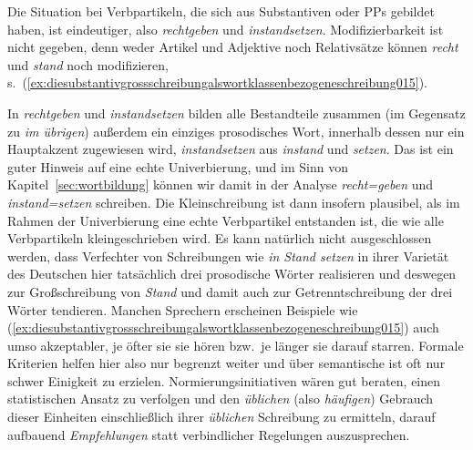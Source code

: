Die Situation bei Verbpartikeln, die sich aus Substantiven oder PPs gebildet haben, ist eindeutiger, also \zB \textit{rechtgeben} und \textit{instandsetzen}.
Modifizierbarkeit ist nicht gegeben, denn weder Artikel und Adjektive noch Relativsätze können \textit{recht} und \textit{stand} noch modifizieren, s.\ (\ref{ex:diesubstantivgrossschreibungalswortklassenbezogeneschreibung015}).


\begin{exe}
  \ex\label{ex:diesubstantivgrossschreibungalswortklassenbezogeneschreibung015}
  \begin{xlist}
  \end{xlist}
\end{exe}

In \textit{rechtgeben} und \textit{instandsetzen} bilden alle Bestandteile zusammen (im Gegensatz zu \textit{im übrigen}) außerdem ein einziges prosodisches Wort, innerhalb dessen nur ein Hauptakzent zugewiesen wird, \zB \textit{in\Akz standsetzen} aus \textit{in\Akz stand} und \textit{\Akz setzen}.
Das ist ein guter Hinweis auf eine echte Univerbierung, und im Sinn von Kapitel~\ref{sec:wortbildung} können wir damit in der Analyse \textit{recht=geben} und \textit{instand=setzen} schreiben.
Die Kleinschreibung ist dann insofern plausibel, als im Rahmen der Univerbierung eine echte Verbpartikel entstanden ist, die wie alle Verbpartikeln kleingeschrieben wird.
Es kann natürlich nicht ausgeschlossen werden, dass Verfechter von Schreibungen wie \textit{in Stand setzen} in ihrer Varietät des Deutschen hier tatsächlich drei prosodische Wörter realisieren und deswegen zur Großschreibung von \textit{Stand} und damit auch zur Getrenntschreibung der drei Wörter tendieren.
Manchen Sprechern erscheinen Beispiele wie (\ref{ex:diesubstantivgrossschreibungalswortklassenbezogeneschreibung015}) auch umso akzeptabler, je öfter sie sie hören bzw.\ je länger sie darauf starren.
Formale Kriterien helfen hier also nur begrenzt weiter und über semantische ist oft nur schwer Einigkeit zu erzielen.
Normierungsinitiativen wären gut beraten, einen statistischen Ansatz zu verfolgen und den \textit{üblichen} (also \textit{häufigen}) Gebrauch dieser Einheiten einschließlich ihrer \textit{üblichen} Schreibung zu ermitteln, darauf aufbauend \textit{Empfehlungen} statt verbindlicher Regelungen auszusprechen.

